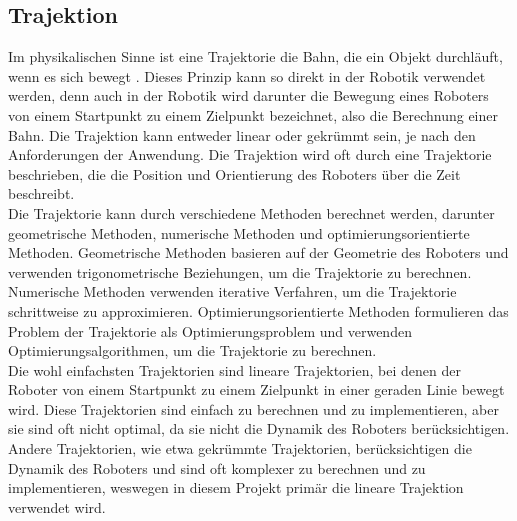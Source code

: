 \subsection{Trajektion}\label{subsec:Trajektion}
Im physikalischen Sinne ist eine Trajektorie die Bahn, die ein Objekt durchläuft, wenn es sich bewegt \cite{wiki-trajektorie}. Dieses Prinzip kann so direkt in der Robotik verwendet werden, denn auch in der Robotik wird darunter die Bewegung eines Roboters von einem Startpunkt zu einem Zielpunkt bezeichnet, also die Berechnung einer Bahn. Die Trajektion kann entweder linear oder gekrümmt sein, je nach den Anforderungen der Anwendung. Die Trajektion wird oft durch eine Trajektorie beschrieben, die die Position und Orientierung des Roboters über die Zeit beschreibt.\\
Die Trajektorie kann durch verschiedene Methoden berechnet werden, darunter geometrische Methoden, numerische Methoden und optimierungsorientierte Methoden. Geometrische Methoden basieren auf der Geometrie des Roboters und verwenden trigonometrische Beziehungen, um die Trajektorie zu berechnen. Numerische Methoden verwenden iterative Verfahren, um die Trajektorie schrittweise zu approximieren. Optimierungsorientierte Methoden formulieren das Problem der Trajektorie als Optimierungsproblem und verwenden Optimierungsalgorithmen, um die Trajektorie zu berechnen.\\
Die wohl einfachsten Trajektorien sind lineare Trajektorien, bei denen der Roboter von einem Startpunkt zu einem Zielpunkt in einer geraden Linie bewegt wird. Diese Trajektorien sind einfach zu berechnen und zu implementieren, aber sie sind oft nicht optimal, da sie nicht die Dynamik des Roboters berücksichtigen. Andere Trajektorien, wie etwa gekrümmte Trajektorien, berücksichtigen die Dynamik des Roboters und sind oft komplexer zu berechnen und zu implementieren, weswegen in diesem Projekt primär die lineare Trajektion verwendet wird.\\

